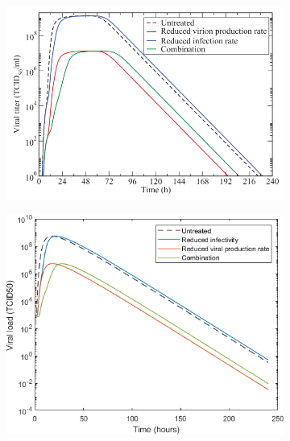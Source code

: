 \documentclass[a4paper,11pt]{article}
\begin{document}
\begin{figure}[ht]
\begin{subfigure}{0.4\textwidth}
    \includegraphics[width=\textwidth]{treatm100.png}
    \end{subfigure}
    \begin{subfigure}{0.35\textwidth}

    \includegraphics[width=\textwidth]{treat100.png}
    \end{subfigure}

    \begin{subfigure}{0.4\textwidth}


\end{subfigure}
\end{figure}
\end{document}
